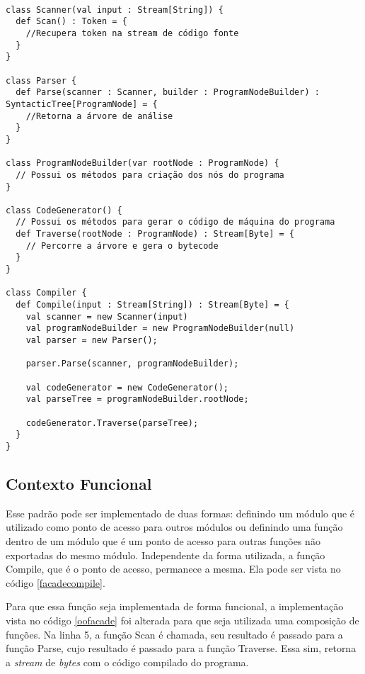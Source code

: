 \begin{lstlisting}[caption={Façade Orientado a Objetos},label=oofacade]

class Scanner(val input : Stream[String]) {
  def Scan() : Token = {
    //Recupera token na stream de código fonte
  }
}

class Parser {
  def Parse(scanner : Scanner, builder : ProgramNodeBuilder) : SyntacticTree[ProgramNode] = {
    //Retorna a árvore de análise
  }
}

class ProgramNodeBuilder(var rootNode : ProgramNode) {
  // Possui os métodos para criação dos nós do programa
}

class CodeGenerator() {
  // Possui os métodos para gerar o código de máquina do programa
  def Traverse(rootNode : ProgramNode) : Stream[Byte] = {
    // Percorre a árvore e gera o bytecode
  }
}

class Compiler {
  def Compile(input : Stream[String]) : Stream[Byte] = {
    val scanner = new Scanner(input)
    val programNodeBuilder = new ProgramNodeBuilder(null)
    val parser = new Parser();

    parser.Parse(scanner, programNodeBuilder);

    val codeGenerator = new CodeGenerator();
    val parseTree = programNodeBuilder.rootNode;

    codeGenerator.Traverse(parseTree);
  }
}

\end{lstlisting}

\subsection*{Contexto Funcional}

Esse padrão pode ser implementado de duas formas: 
definindo um módulo que é utilizado como ponto de 
acesso para outros módulos ou definindo uma 
função dentro de um módulo que é um ponto de 
acesso para outras funções não exportadas do 
mesmo módulo. Independente da forma utilizada, 
a função Compile, que é o ponto de acesso, permanece 
a mesma. Ela pode ser vista no código \ref{facadecompile}. 

Para que essa função seja implementada de forma 
funcional, a implementação vista no código \ref{oofacade} 
foi alterada para que seja utilizada uma composição 
de funções. Na linha 5, a função Scan é chamada, 
seu resultado é passado para a função Parse, cujo 
resultado é passado para a função Traverse. Essa sim, 
retorna a \textit{stream} de \textit{bytes} com o 
código compilado do programa.


